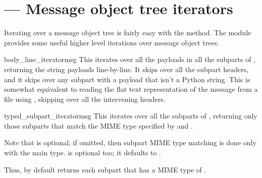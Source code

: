 \section{ ---
         Message object tree iterators}



Iterating over a message object tree is fairly easy with the
 method.  The  module
provides some useful higher level iterations over message object
trees.

\begin{funcdesc}{body_line_iterator}{msg}
This iterates over all the payloads in all the subparts of ,
returning the string payloads line-by-line.  It skips over all the
subpart headers, and it skips over any subpart with a payload that
isn't a Python string.  This is somewhat equivalent to reading the
flat text representation of the message from a file using
, skipping over all the intervening headers.
\end{funcdesc}

\begin{funcdesc}{typed_subpart_iterator}{msg}
This iterates over all the subparts of , returning only those
subparts that match the MIME type specified by  and
.

Note that  is optional; if omitted, then subpart MIME
type matching is done only with the main type.   is
optional too; it defaults to .

Thus, by default  returns each
subpart that has a MIME type of .
\end{funcdesc}

